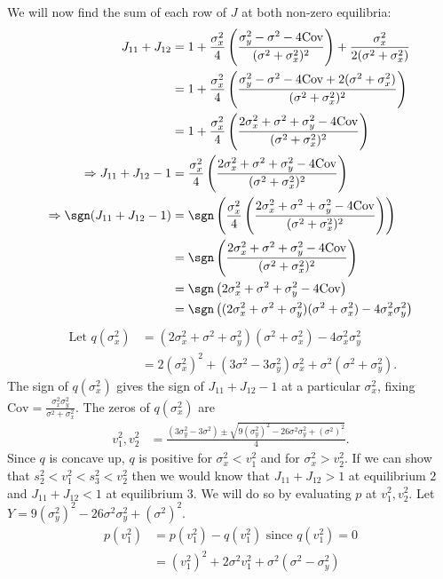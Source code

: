 \documentclass{article}
\newcommand{\Cov}{\text{Cov}}
\begin{document}
\begin{enumerate}
We will now find the sum of each row of $J$ at both non-zero equilibria: 
\begin{align*}
J_{11}+J_{12}&=1 + \frac{\sigma_x^2}{4}\left(\frac{\sigma_y^2-\sigma^2-4\Cov}{(\sigma^2+\sigma_x^2)^2}\right)+\frac{\sigma_x^2}{2(\sigma^2+\sigma_x^2)}
\\&=1 + \frac{\sigma_x^2}{4}\left(\frac{\sigma_y^2-\sigma^2-4\Cov+2(\sigma^2+\sigma_x^2)}{(\sigma^2+\sigma_x^2)^2}\right)
\\&=1 + \frac{\sigma_x^2}{4}\left(\frac{2\sigma_x^2+\sigma^2+\sigma_y^2-4\Cov}{(\sigma^2+\sigma_x^2)^2}\right)
\\ \Rightarrow J_{11}+J_{12}-1&=\frac{\sigma_x^2}{4}\left(\frac{2\sigma_x^2+\sigma^2+\sigma_y^2-4\Cov}{(\sigma^2+\sigma_x^2)^2}\right)
\\ \Rightarrow \sgn(J_{11}+J_{12}-1)&=\sgn\left(\frac{\sigma_x^2}{4}\left(\frac{2\sigma_x^2+\sigma^2+\sigma_y^2-4\Cov}{(\sigma^2+\sigma_x^2)^2}\right)\right)
\\&=\sgn\left(\frac{2\sigma_x^2+\sigma^2+\sigma_y^2-4\Cov}{(\sigma^2+\sigma_x^2)^2}\right)
\\&=\sgn\left(2\sigma_x^2+\sigma^2+\sigma_y^2-4\Cov\right)
\\&=\sgn\left((2\sigma_x^2+\sigma^2+\sigma_y^2)(\sigma^2+\sigma_x^2)-4\sigma_x^2\sigma_y^2\right)
\end{align*}
\begin{align*}
\text{ Let } q(\sigma_x^2)&=(2\sigma_x^2+\sigma^2+\sigma_y^2)(\sigma^2+\sigma_x^2)-4\sigma_x^2\sigma_y^2
\\&=2(\sigma_x^2)^2+(3\sigma^2-3\sigma_y^2)\sigma_x^2+\sigma^2(\sigma^2+\sigma_y^2).
\end{align*}
The sign of $q(\sigma_x^2)$ gives the sign of $J_{11}+J_{12}-1$ at a particular $\sigma_x^2$, fixing $\Cov=\frac{\sigma_x^2\sigma_y^2}{\sigma^2+\sigma_x^2}$. The zeros of $q(\sigma_x^2)$ are 
\begin{align*}
v_1^2,v_2^2&=\frac{(3\sigma_y^2-3\sigma^2)\pm\sqrt{9(\sigma_y^2)^2-26\sigma^2\sigma_y^2+(\sigma^2)^2}}{4}.
\end{align*}
Since $q$ is concave up, $q$ is positive for $\sigma_x^2<v_1^2$ and for $\sigma_x^2>v_2^2$. If we can show that $s_2^2<v_1^2<s_3^2<v_2^2$ then we would know that $J_{11}+J_{12}>1$ at equilibrium $2$ and $J_{11}+J_{12}<1$ at equilibrium $3$. We will do so by evaluating $p$ at $v_1^2,v_2^2$. Let $Y=9(\sigma_y^2)^2-26\sigma^2\sigma_y^2+(\sigma^2)^2$.
\begin{align*}
p(v_1^2)&=p(v_1^2)-q(v_1^2) \text{ since } q(v_1^2)=0
\\ &=(v_1^2)^2+2\sigma^2v_1^2+\sigma^2(\sigma^2-\sigma_y^2)

\end{align*}
\end{enumerate}
\end{document}
